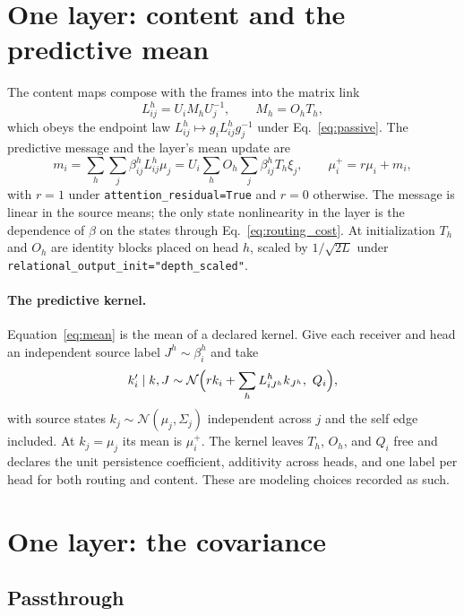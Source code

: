 \documentclass[11pt]{article}
\theoremstyle{definition}
\theoremstyle{remark}
\newcommand{\N}{\mathcal{N}}
\newcommand{\cfg}[1]{\texttt{#1}}
\begin{document}
\section{One layer: content and the predictive mean}
\label{sec:content}

The content maps compose with the frames into the matrix link
\begin{equation}
L_{ij}^{h}=U_iM_hU_j^{-1},\qquad M_h=O_hT_h,
\label{eq:link}
\end{equation}
which obeys the endpoint law $L_{ij}^{h}\mapsto g_iL_{ij}^{h}g_j^{-1}$ under Eq.~\eqref{eq:passive}. The predictive message and the layer's mean update are
\begin{equation}
m_i=\sum_h\sum_j\beta_{ij}^{h}L_{ij}^{h}\mu_j=U_i\sum_hO_h\sum_j\beta_{ij}^{h}T_h\xi_j,
\qquad
\mu_i^{+}=r\mu_i+m_i,
\label{eq:mean}
\end{equation}
with $r=1$ under \cfg{attention\_residual=True} and $r=0$ otherwise. The message is linear in the source means; the only state nonlinearity in the layer is the dependence of $\beta$ on the states through Eq.~\eqref{eq:routing_cost}. At initialization $T_h$ and $O_h$ are identity blocks placed on head $h$, scaled by $1/\sqrt{2L}$ under \cfg{relational\_output\_init="depth\_scaled"}.

\paragraph{The predictive kernel.}
Equation~\eqref{eq:mean} is the mean of a declared kernel. Give each receiver and head an independent source label $J^{h}\sim\beta_i^{h}$ and take
\begin{equation}
k_i'\mid k,J\sim\N\Bigl(rk_i+\sum_hL_{iJ^{h}}^{h}k_{J^{h}},\ Q_i\Bigr),
\label{eq:kernel}
\end{equation}
with source states $k_j\sim\N(\mu_j,\Sigma_j)$ independent across $j$ and the self edge included. At $k_j=\mu_j$ its mean is $\mu_i^{+}$. The kernel leaves $T_h$, $O_h$, and $Q_i$ free and declares the unit persistence coefficient, additivity across heads, and one label per head for both routing and content. These are modeling choices recorded as such.

\section{One layer: the covariance}
\label{sec:covariance}

\subsection{Passthrough}
\end{document}
